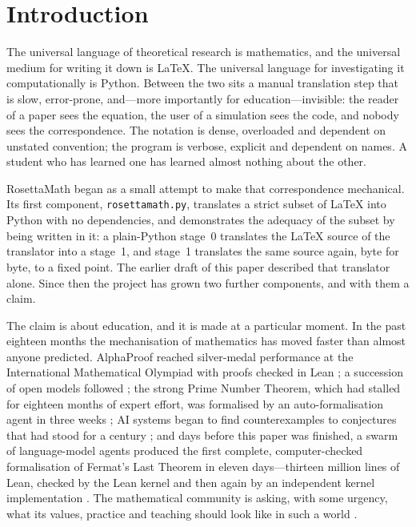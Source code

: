 \documentclass[11pt]{article}
\begin{document}
\section{Introduction}

The universal language of theoretical research is mathematics, and the
universal medium for writing it down is \LaTeX{}. The universal language for
investigating it computationally is Python. Between the two sits a manual
translation step that is slow, error-prone, and---more importantly for
education---invisible: the reader of a paper sees the equation, the user of a
simulation sees the code, and nobody sees the correspondence. The notation is
dense, overloaded and dependent on unstated convention; the program is verbose,
explicit and dependent on names. A student who has learned one has learned
almost nothing about the other.

RosettaMath began as a small attempt to make that correspondence mechanical.
Its first component, \texttt{rosettamath.py}, translates a strict subset of
\LaTeX{} into Python with no dependencies, and demonstrates the adequacy of the
subset by being written in it: a plain-Python stage~0 translates the \LaTeX{}
source of the translator into a stage~1, and stage~1 translates the same source
again, byte for byte, to a fixed point. The earlier draft of this paper
described that translator alone. Since then the project has grown two further
components, and with them a claim.

The claim is about education, and it is made at a particular moment. In the
past eighteen months the mechanisation of mathematics has moved faster than
almost anyone predicted. AlphaProof reached silver-medal performance at the
International Mathematical Olympiad with proofs checked in Lean
\cite{hubert2025}; a succession of open models followed
\cite{ren2025,wang2025kimina,chen2025seed,lin2025goedel,achim2025aristotle};
the strong Prime Number Theorem, which had stalled for eighteen months of expert
effort, was formalised by an auto-formalisation agent in three weeks
\cite{mathinc2025gauss}; AI systems began to find counterexamples to conjectures
that had stood for a century \cite{buzzard2026counter}; and days before this
paper was finished, a swarm of language-model agents produced the first complete,
computer-checked formalisation of Fermat's Last Theorem in eleven days---thirteen
million lines of Lean, checked by the Lean kernel and then again by an independent
kernel implementation \cite{anthropic2026flt,newscientist2026flt}. The
mathematical community is asking, with some urgency, what its values, practice
and teaching should look like in such a world \cite{commelin2026,sloman2026,simons2026}.
\end{document}
